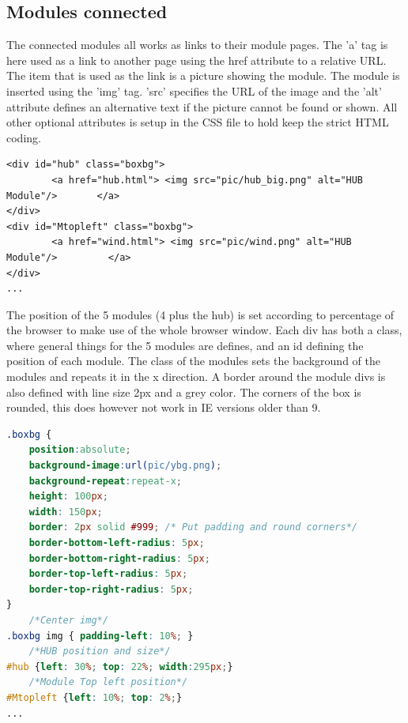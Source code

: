 \subsection{Modules connected}
The connected modules all works as links to their module pages. The 'a' tag is here used as a link to another page using the href attribute to a relative URL. The item that is used as the link is a picture showing the module. The module is inserted using the 'img' tag. 'src' specifies the URL of the image and the 'alt' attribute defines an alternative text if the picture cannot be found or shown. All other optional attributes is setup in the CSS file to hold keep the strict HTML coding.
\begin{lstlisting}
<div id="hub" class="boxbg">
		<a href="hub.html"> <img src="pic/hub_big.png" alt="HUB Module"/> 		</a>
</div>
<div id="Mtopleft" class="boxbg">
		<a href="wind.html"> <img src="pic/wind.png" alt="HUB Module"/> 		</a>
</div>
...
\end{lstlisting}
The position of the 5 modules (4 plus the hub) is set according to percentage of the browser to make use of the whole browser window. Each div has both a class, where general things for the 5 modules are defines, and an id defining the position of each module. The class of the modules sets the background of the modules and repeats it in the x direction. A border around the module divs is also defined with line size 2px and a grey color. The corners of the box is rounded, this does however not work in IE versions older than 9.
\begin{lstlisting}[language=CSS]
.boxbg {
	position:absolute;
	background-image:url(pic/ybg.png);
	background-repeat:repeat-x;
	height: 100px;
	width: 150px;
	border: 2px solid #999;	/* Put padding and round corners*/
	border-bottom-left-radius: 5px;
	border-bottom-right-radius: 5px;
	border-top-left-radius: 5px;
	border-top-right-radius: 5px;
}
	/*Center img*/
.boxbg img { padding-left: 10%; }
	/*HUB position and size*/
#hub {left: 30%; top: 22%; width:295px;}
	/*Module Top left position*/
#Mtopleft {left: 10%; top: 2%;}
...
\end{lstlisting}

